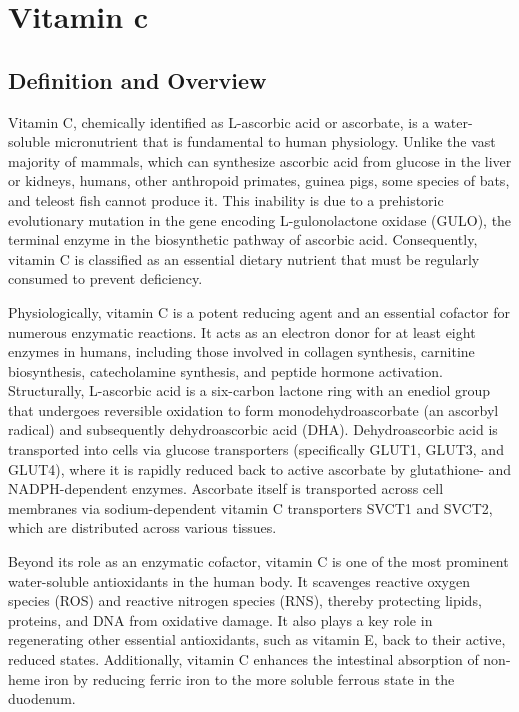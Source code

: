 \chapter{Vitamin c}

\section*{Definition and Overview}
Vitamin C, chemically identified as L-ascorbic acid or ascorbate, is a water-soluble micronutrient that is fundamental to human physiology. Unlike the vast majority of mammals, which can synthesize ascorbic acid from glucose in the liver or kidneys, humans, other anthropoid primates, guinea pigs, some species of bats, and teleost fish cannot produce it. This inability is due to a prehistoric evolutionary mutation in the gene encoding L-gulonolactone oxidase (GULO), the terminal enzyme in the biosynthetic pathway of ascorbic acid. Consequently, vitamin C is classified as an essential dietary nutrient that must be regularly consumed to prevent deficiency.

Physiologically, vitamin C is a potent reducing agent and an essential cofactor for numerous enzymatic reactions. It acts as an electron donor for at least eight enzymes in humans, including those involved in collagen synthesis, carnitine biosynthesis, catecholamine synthesis, and peptide hormone activation. Structurally, L-ascorbic acid is a six-carbon lactone ring with an enediol group that undergoes reversible oxidation to form monodehydroascorbate (an ascorbyl radical) and subsequently dehydroascorbic acid (DHA). Dehydroascorbic acid is transported into cells via glucose transporters (specifically GLUT1, GLUT3, and GLUT4), where it is rapidly reduced back to active ascorbate by glutathione- and NADPH-dependent enzymes. Ascorbate itself is transported across cell membranes via sodium-dependent vitamin C transporters SVCT1 and SVCT2, which are distributed across various tissues.

Beyond its role as an enzymatic cofactor, vitamin C is one of the most prominent water-soluble antioxidants in the human body. It scavenges reactive oxygen species (ROS) and reactive nitrogen species (RNS), thereby protecting lipids, proteins, and DNA from oxidative damage. It also plays a key role in regenerating other essential antioxidants, such as vitamin E, back to their active, reduced states. Additionally, vitamin C enhances the intestinal absorption of non-heme iron by reducing ferric iron to the more soluble ferrous state in the duodenum.

